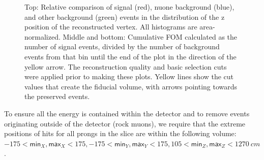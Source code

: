 \begin{figure}[hbtp]
\caption[Vertex z containment cut]{Top: Relative comparison of signal (red), \acrshort{nuone} background (blue), and other background (green) events in the distribution of the z position of the reconstructed vertex. All histograms are area-normalized. Middle and bottom: Cumulative \acrshort{FOM} calculated as the number of signal events, divided by the number of background events from that bin until the end of the plot in the direction of the yellow arrow. The reconstruction quality and basic selection cuts were applied prior to making these plots. Yellow lines show the cut values that create the fiducial volume, with arrows pointing towards the preserved events.}
\label{fig:NuMMFiducialCutY}
\end{figure}

To ensure all the energy is contained within the detector and to remove events originating outside of the detector (rock muons), we require that the extreme positions of hits for all prongs in the slice are within the following volume: $-175<\textsf{min}_X, \textsf{max}_X<175, -175<\textsf{min}_Y, \textsf{max}_Y<175, 105<\textsf{min}_Z, \textsf{max}_Z<1270\ \unit{cm}$. 

